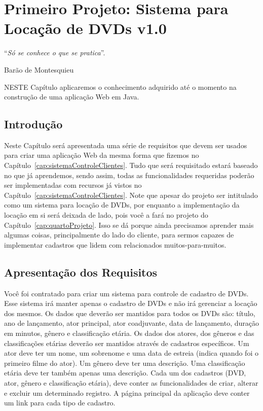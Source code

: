 \chapter{Primeiro Projeto: Sistema para Locação de DVDs v1.0}\label{cap:primeiroProjeto}
\epigraph{``\textit{Só se conhece o que se pratica}''.}{Barão de Montesquieu}

\lettrine[lines=4, lhang=0.1, lraise=0, loversize=0.2, findent=0.1em]{\textcolor{corTema}{N}}{ESTE} Capítulo aplicaremos o conhecimento adquirido até o momento na construção de uma aplicação Web em Java.


\section{Introdução}

Neste Capítulo será apresentada uma série de requisitos que devem ser usados para criar uma aplicação Web da mesma forma que fizemos no Capítulo~\ref{cap:sistemaControleClientes}. Tudo que será requisitado estará baseado no que já aprendemos, sendo assim, todas as funcionalidades requeridas poderão ser implementadas com recursos já vistos no Capítulo~\ref{cap:sistemaControleClientes}. Note que apesar do projeto ser intitulado como um sistema para locação de DVDs, por enquanto a implementação da locação em si será deixada de lado, pois você a fará no projeto do Capítulo~\ref{cap:quartoProjeto}. Isso se dá porque ainda precisamos aprender mais algumas coisas, principalmente do lado do cliente, para sermos capazes de implementar cadastros que lidem com relacionados muitos-para-muitos.


\section{Apresentação dos Requisitos}

Você foi contratado para criar um sistema para controle de cadastro de DVDs. Esse sistema irá manter apenas o cadastro de DVDs e não irá gerenciar a locação dos mesmos. Os dados que deverão ser mantidos para todos os DVDs são: título, ano de lançamento, ator principal, ator coadjuvante, data de lançamento, duração em minutos, gênero e classificação etária. Os dados dos atores, dos gêneros e das classificações etárias deverão ser mantidos através de cadastros específicos. Um ator deve ter um nome, um sobrenome e uma data de estreia (indica quando foi o primeiro filme do ator). Um gênero deve ter uma descrição. Uma classificação etária deve ter também apenas uma descrição. Cada um dos cadastros (DVD, ator, gênero e classificação etária), deve conter as funcionalidades de criar, alterar e excluir um determinado registro. A página principal da aplicação deve conter um link para cada tipo de cadastro.


